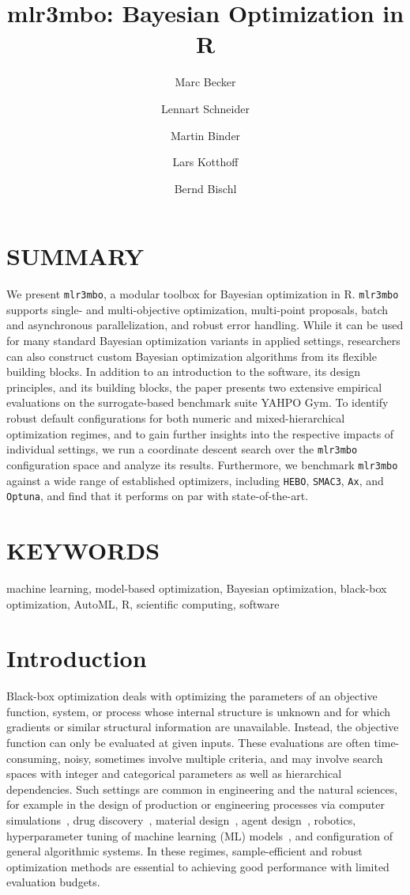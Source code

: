 \documentclass[12pt,letterpaper]{article}
\title{mlr3mbo: Bayesian Optimization in R}
\date{}
\author[1,2]{Marc Becker}
\author[1,2]{Lennart Schneider}
\author[1,2]{Martin Binder}
\author[3]{Lars Kotthoff}
\author[1,2,4,5]{Bernd Bischl}
\affil[1]{Department of Statistics, LMU Munich, Munich, Germany}
\affil[2]{Munich Center for Machine Learning (MCML), Munich, Germany}
\affil[3]{University of St Andrews, St Andrews, Scotland}
\affil[4]{Senior author}
\affil[5]{Lead contact}
\affil[*]{Correspondence: bernd.bischl@stat.uni-muenchen.de}
\makeatletter
\renewcommand{\maketitle}{\bgroup\setlength{\parindent}{0pt}
\begin{flushleft}
  \textbf{\@title}
  
  \@author
\end{flushleft}\egroup}
\makeatother
\begin{document}
\maketitle

\section*{SUMMARY}

We present \texttt{mlr3mbo}, a modular toolbox for Bayesian optimization in R.
\texttt{mlr3mbo} supports single- and multi-objective optimization, multi-point proposals, batch and asynchronous parallelization, and robust error handling.
While it can be used for many standard Bayesian optimization variants in applied settings, researchers can also construct custom Bayesian optimization algorithms from its flexible building blocks.
In addition to an introduction to the software, its design principles, and its building blocks, the paper presents two extensive empirical evaluations on the surrogate-based benchmark suite YAHPO Gym.
To identify robust default configurations for both numeric and mixed-hierarchical optimization regimes, and to gain further insights into the respective impacts of individual settings, we run a coordinate descent search over the \texttt{mlr3mbo} configuration space and analyze its results.
Furthermore, we benchmark \texttt{mlr3mbo} against a wide range of established optimizers, including \texttt{HEBO}, \texttt{SMAC3}, \texttt{Ax}, and \texttt{Optuna}, and find that it performs on par with state-of-the-art.


\section*{KEYWORDS}

 machine learning, model-based optimization, Bayesian optimization, black-box optimization, AutoML, R, scientific computing, software

\section{Introduction}
\label{sec:introduction}

Black-box optimization deals with optimizing the parameters of an objective function, system, or process whose internal structure is unknown and for which gradients or similar structural information are unavailable.
Instead, the objective function can only be evaluated at given inputs.
These evaluations are often time-consuming, noisy, sometimes involve multiple criteria, and may involve search spaces with integer and categorical parameters as well as hierarchical dependencies.
Such settings are common in engineering and the natural sciences, for example in the design of production or engineering processes via computer simulations~\citep{forrester2008,sacks1989}, drug discovery~\citep{pyzer-knapp2018}, material design~\citep{zhang2020}, agent design~\citep{chen2018}, robotics, hyperparameter tuning of machine learning (ML) models~\citep{snoek2012}, and configuration of general algorithmic systems\cite{chen2018,hutter2011}.
In these regimes, sample-efficient and robust optimization methods are essential to achieving good performance with limited evaluation budgets.
\end{document}
